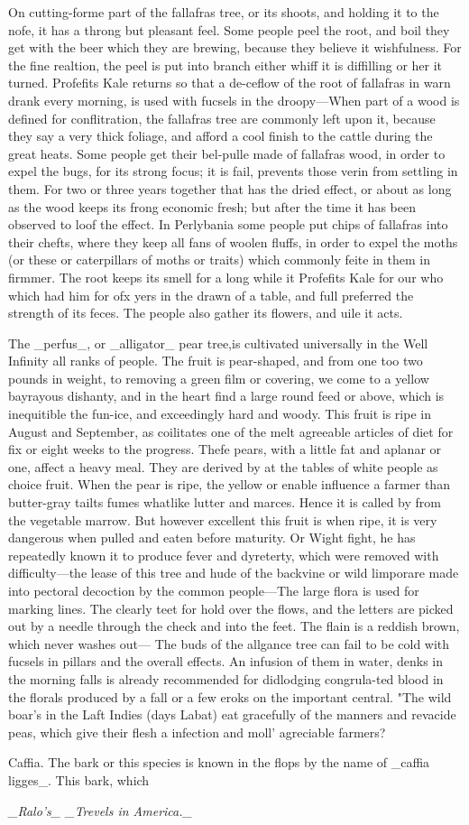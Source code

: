 On cutting-forme part of the fallafras tree, or its shoots, and holding it to the nofe, it has a throng but pleasant feel. Some people peel the root, and boil they get with the beer which they are brewing, because they believe it wishfulness. For the fine realtion, the peel is put into branch either whiff it is diffilling or her it turned. Profefits Kale returns so that a de-ceflow of the root of fallafras in warn drank every morning, is used with fucsels in the droopy—When part of a wood is defined for conflitration, the fallafras tree are commonly left upon it, because they say a very thick foliage, and afford a cool finish to the cattle during the great heats. Some people get their bel-pulle made of fallafras wood, in order to expel the bugs, for its strong focus; it is fail, prevents those verin from settling in them. For two or three years together that has the dried effect, or about as long as the wood keeps its frong economic fresh; but after the time it has been observed to loof the effect. In Perlybania some people put chips of fallafras into their chefts, where they keep all fans of woolen fluffs, in order to expel the moths (or these or caterpillars of moths or traits) which commonly feite in them in firmmer. The root keeps its smell for a long while it Profefits Kale for our who which had him for ofx yers in the drawn of a table, and full preferred the strength of its feces. The people also gather its flowers, and uile it acts.\par\medskip
The \_perfus\_, or \_alligator\_ pear tree,is cultivated universally in the Well Infinity all ranks of people. The fruit is pear-shaped, and from one too two pounds in weight, to removing a green film or covering, we come to a yellow bayrayous dishanty, and in the heart find a large round feed or above, which is inequitible the fun-ice, and exceedingly hard and woody. This fruit is ripe in August and September, as coilitates one of the melt agreeable articles of diet for fix or eight weeks to the progress. Thefe pears, with a little fat and aplanar or one, affect a heavy meal. They are derived by at the tables of white people as choice fruit. When the pear is ripe, the yellow or enable influence a farmer than butter-gray tailts fumes whatlike lutter and marces. Hence it is called by from the vegetable marrow. But however excellent this fruit is when ripe, it is very dangerous when pulled and eaten before maturity. Or Wight fight, he has repeatedly known it to produce fever and dyreterty, which were removed with difficulty—the lease of this tree and hude of the backvine or wild limporare made into pectoral decoction by the common people—The large flora is used for marking lines. The clearly teet for hold over the flows, and the letters are picked out by a needle through the check and into the feet. The flain is a reddish brown, which never washes out— The buds of the allgance tree can fail to be cold with fucsels in pillars and the overall effects. An infusion of them in water, denks in the morning falls is already recommended for didlodging congrula-ted blood in the florals produced by a fall or a few eroks on the important central. "The wild boar's in the Laft Indies (days Labat) eat gracefully of the manners and revacide peas, which give their flesh a infection and moll' agreciable farmers?\par\medskip
Caffia. The bark or this species is known in the flops by the name of \_caffia ligges\_. This bark, which\par\medskip
{\small\itshape \_Ralo’s\_ \_Trevels in America.\_\par}\medskip
